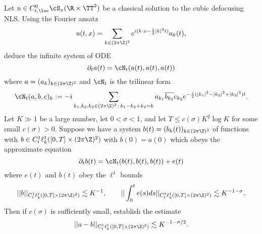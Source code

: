 \begin{solution}

\end{solution}

\begin{statement}
	Let $u \in C^0_{t, \loc} \cS_x (\R \times \TT^2)$ be a classical solution to the cubic defocusing NLS. Using the Fourier ansatz
		\[ u(t, x) = \sum_{k \in (2\pi \Z)^2} e^{i (k \cdot x - \frac12 |k|^2 t)} a_k (t), \]
	deduce the infinite system of ODE
		\[ \partial_t a(t) = \cN_t (a(t), a(t), a(t)) \]
	where $a = (a_k)_{k \in (2\pi \Z)^2}$ and $\cN_t$ is the trilinear form
		\[ \cN_t (a, b, c)_k := -i \sum_{k_1, k_2, k_3 \in (2\pi \Z)^2 \, : \, k_1 - k_2 + k_3 = k} a_{k_1} \overline{b_{k_2}} c_{k_3} e^{-\frac{i}{2} (|k_1|^2 - |k_2|^2 + |k_3|^2)t}. \]		
	Let $K \gg 1$ be a large number, let $0 < \sigma < 1$, and let $T \leq c(\sigma) K^2 \log K$ for some small $c(\sigma) > 0$. Suppose we have a system $b(t) = (b_k (t))_{k \in (2\pi \Z)^2}$ of functions with $b \in C^1_t \ell^1_k ([0, T] \times (2\pi \Z)^2)$ with $b(0) = a(0)$ which obeys the approximate equation 
		\[ \partial_t b(t) = \cN_t (b(t), b(t), b(t)) + e(t) \]
	where $e(t)$ and $b(t)$ obey the $\ell^1$ bounds
		\[ ||b||_{C^1_t \ell^1_k([0, T] \times (2\pi\Z)^2)} \lesssim K^{-1}, \qquad || \int_0^t e(s) ds||_{C^0_t \ell^1_k ([0, T] \times (2\pi\Z)^2)} \lesssim K^{- 1 - \sigma}. \]
	Then if $c(\sigma)$ is sufficiently small, establish the estimate
		\[ ||a - b||_{C^1_t \ell^1_k([0, T] \times (2\pi\Z)^2)} \lesssim K^{-1 - \sigma/2}. \]			
\end{statement}

